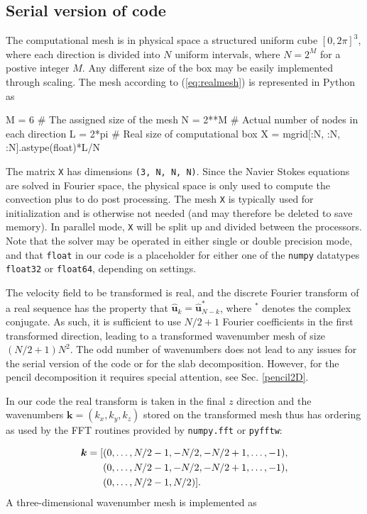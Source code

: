 \documentclass[11pt, oneside]{article}
\newcommand{\inpyth}{\lstinline[style=pythonstyle, basicstyle=\ttfamily]} %[]%
\begin{document}
\subsection{Serial version of code}
The computational mesh is in physical space a structured uniform cube $[0, 2\pi]^3$, where each direction is divided into $N$ uniform intervals, where $N=2^M$ for a postive integer $M$. Any different size of the box may be easily implemented through scaling. The mesh according to (\ref{eq:realmesh}) is represented in Python as

\begin{python}
M = 6       # The assigned size of the mesh
N = 2**M    # Actual number of nodes in each direction
L = 2*pi    # Real size of computational box
X = mgrid[:N, :N, :N].astype(float)*L/N
\end{python}
The matrix \inpyth{X} has dimensions \inpyth{(3, N, N, N)}. Since the Navier Stokes equations are solved in Fourier space, the physical space is only used to compute the convection plus to do post processing. The mesh \inpyth{X} is typically used for initialization and is otherwise not needed (and may therefore be deleted to save memory). In parallel mode, \inpyth{X} will be split up and divided between the processors.  Note that the solver may be operated in either single or double precision mode, and that \inpyth{float} in our code is a placeholder for either one of the \inpyth{numpy} datatypes \inpyth{float32} or \inpyth{float64}, depending on settings.

The velocity field to be transformed is real, and the discrete Fourier transform of a real sequence has the property that $\hat{\bm{u}}_k = \hat{\bm{u}}_{N-k}^*$, where $^*$ denotes the complex conjugate. As such, it is sufficient to use $N/2+1$ Fourier coefficients in the first transformed direction, leading to a transformed wavenumber mesh of size $(N/2+1)N^2$. The odd number of wavenumbers does not lead to any issues for the serial version of the code or for the slab decomposition. However, for the pencil decomposition it requires special attention, see Sec. \ref{pencil2D}. 

In our code the real transform is taken in the final $z$ direction and the wavenumbers $\bm{k}=(k_x, k_y, k_z)$ stored on the transformed mesh thus has ordering as used by the FFT routines provided by \texttt{numpy.fft} or \texttt{pyfftw}:

\begin{align}
  \bm{k} = [&(0, \ldots, N/2-1, -N/2, -N/2+1, \ldots, -1), \notag \\
   &(0, \ldots, N/2-1, -N/2, -N/2+1, \ldots, -1),  \notag \\
  &(0, \ldots, N/2-1, N/2)].
\end{align}
A three-dimensional wavenumber mesh is implemented as
\end{document}
